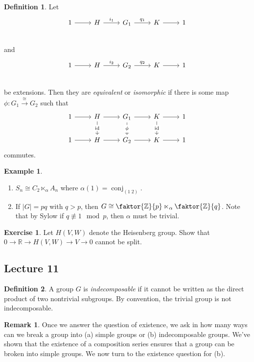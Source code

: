 \documentclass[10pt,letterpaper,cm]{nupset}
\theoremstyle{definition}
\newtheorem*{definition}{Definition}
\newtheorem{exmp}{Example}
\newtheorem{remark}{Remark}
\newtheorem{exercise}{Exercise}
\newcommand{\R}{\mathbb R}
\newcommand{\Z}{\mathbb Z}
\newcommand{\1}{\mathbf{1}}
\newcommand{\0}{\vec 0}
\DeclareMathOperator{\id}{id}
\DeclareMathOperator{\conj}{conj}
\begin{document}
\begin{definition}
Let \[
	\begin{tikzcd}
	1\rar &H\rar["i_1" above] & G_1 \rar["q_1" above] & K\rar& 1 \\
	\end{tikzcd}
\]
and 
\[
	\begin{tikzcd}
	1\rar &H\rar["i_2" above] & G_2 \rar["q_2" above] & K\rar& 1 \\
	\end{tikzcd}
\]
be extensions. Then they are \textit{equivalent} or \textit{isomorphic} if there is some map $\phi : G_1 \overset{\cong}{\longrightarrow} G_2$ such that 
\[
\begin{tikzcd}
1 \arrow[r] & H \arrow[r] \arrow[d, "\id" description] & G_1 \arrow[r] \arrow[d, "\phi" description] & K \arrow[r] \arrow[d, "\id" description] & 1 \\
1 \arrow[r] & H \arrow[r] & G_2 \arrow[r] & K \arrow[r] & 1
\end{tikzcd}
\]
commutes.
\end{definition}

\begin{exmp} $ $
\begin{enumerate}
\item $S_n \cong C_2 \ltimes_{\alpha} A_n$ where $\alpha(1) = \conj_{(1 \; 2)}$.
\item  If $|G| = pq$ with $q>p$, then $G \cong \faktor{\Z}{p} \ltimes_{\alpha} \faktor{\Z}{q}$. Note that by Sylow if $q\not \equiv 1 \mod p$, then $\alpha$ must be trivial. 
\end{enumerate}
\end{exmp}

\begin{exercise}
Let $H(V, W)$ denote the Heisenberg group. Show that $0 \to \R \to H(V, W) \to V \to 0$ cannot be split.
\end{exercise}

\subsection{Lecture 11}

\begin{definition}
A group $G$ is \textit{indecomposable} if it cannot be written as the direct product of two nontrivial subgroups. By convention, the trivial group is not indecomposable. 
\end{definition}

\begin{remark}
Once we answer the question of existence, we ask in how many ways can we break a group into (a) simple groups or (b) indecomposable groups. We've shown that the existence of a composition series ensures that a group can be broken into simple groups. We now turn to the existence question for (b).
\end{remark}
\end{document}
